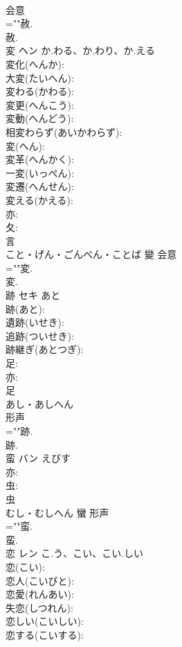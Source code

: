 \documentclass[8pt]{extreport}
\begin{document}
\begin{CJK}{UTF8}{min}
\\	会意 
\\	=""赦.
\\	赦.
\\	変	ヘン	か.わる、か.わり、か.える		
\\	変化(へんか): 
\\	大変(たいへん): 
\\	変わる(かわる): 
\\	変更(へんこう): 
\\	変動(へんどう): 
\\	相変わらず(あいかわらず): 
\\	変(へん): 
\\	変革(へんかく): 
\\	一変(いっぺん): 
\\	変遷(へんせん): 
\\	変える(かえる): 
\\	亦: 
\\	夂: 
\\	言	
\\	こと・げん・ごんべん・ことば	變	会意 
\\	=""変.
\\	変.
\\	跡	セキ	あと		
\\	跡(あと): 
\\	遺跡(いせき): 
\\	追跡(ついせき): 
\\	跡継ぎ(あとつぎ): 
\\	足: 
\\	亦: 
\\	足	
\\	あし・あしへん	
\\	形声 
\\	=""跡.
\\	跡.
\\	蛮	バン	えびす		
\\	亦: 
\\	虫: 
\\	虫	
\\	むし・むしへん	蠻	形声 
\\	=""蛮.
\\	蛮.
\\	恋	レン	こ.う、こい、こい.しい		
\\	恋(こい): 
\\	恋人(こいびと): 
\\	恋愛(れんあい): 
\\	失恋(しつれん): 
\\	恋しい(こいしい): 
\\	恋する(こいする): 

\end{CJK}
\end{document}
